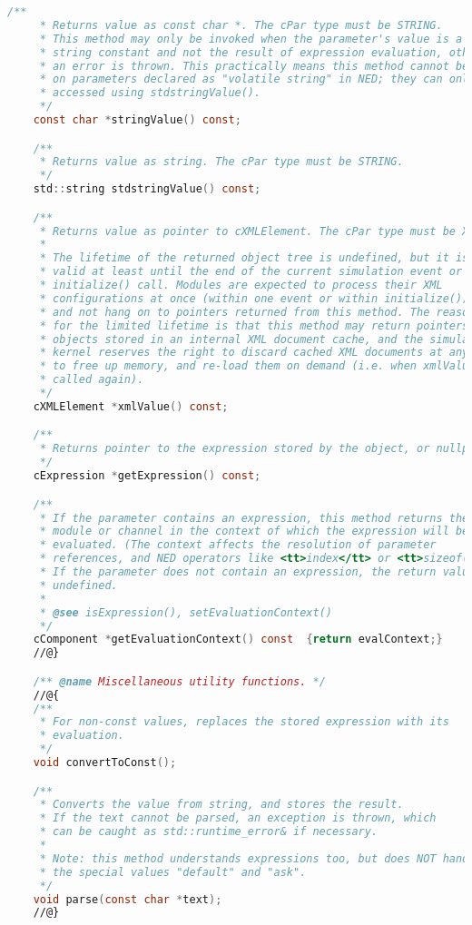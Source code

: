 \begin{lstlisting}[language=c]
    /**
     * Returns value as const char *. The cPar type must be STRING.
     * This method may only be invoked when the parameter's value is a
     * string constant and not the result of expression evaluation, otherwise
     * an error is thrown. This practically means this method cannot be used
     * on parameters declared as "volatile string" in NED; they can only be
     * accessed using stdstringValue().
     */
    const char *stringValue() const;

    /**
     * Returns value as string. The cPar type must be STRING.
     */
    std::string stdstringValue() const;

    /**
     * Returns value as pointer to cXMLElement. The cPar type must be XML.
     *
     * The lifetime of the returned object tree is undefined, but it is
     * valid at least until the end of the current simulation event or
     * initialize() call. Modules are expected to process their XML
     * configurations at once (within one event or within initialize()),
     * and not hang on to pointers returned from this method. The reason
     * for the limited lifetime is that this method may return pointers to
     * objects stored in an internal XML document cache, and the simulation
     * kernel reserves the right to discard cached XML documents at any time
     * to free up memory, and re-load them on demand (i.e. when xmlValue() is
     * called again).
     */
    cXMLElement *xmlValue() const;

    /**
     * Returns pointer to the expression stored by the object, or nullptr.
     */
    cExpression *getExpression() const;

    /**
     * If the parameter contains an expression, this method returns the
     * module or channel in the context of which the expression will be
     * evaluated. (The context affects the resolution of parameter
     * references, and NED operators like <tt>index</tt> or <tt>sizeof()</tt>.)
     * If the parameter does not contain an expression, the return value is
     * undefined.
     *
     * @see isExpression(), setEvaluationContext()
     */
    cComponent *getEvaluationContext() const  {return evalContext;}
    //@}

    /** @name Miscellaneous utility functions. */
    //@{
    /**
     * For non-const values, replaces the stored expression with its
     * evaluation.
     */
    void convertToConst();

    /**
     * Converts the value from string, and stores the result.
     * If the text cannot be parsed, an exception is thrown, which
     * can be caught as std::runtime_error& if necessary.
     *
     * Note: this method understands expressions too, but does NOT handle
     * the special values "default" and "ask".
     */
    void parse(const char *text);
    //@}


\end{lstlisting}
